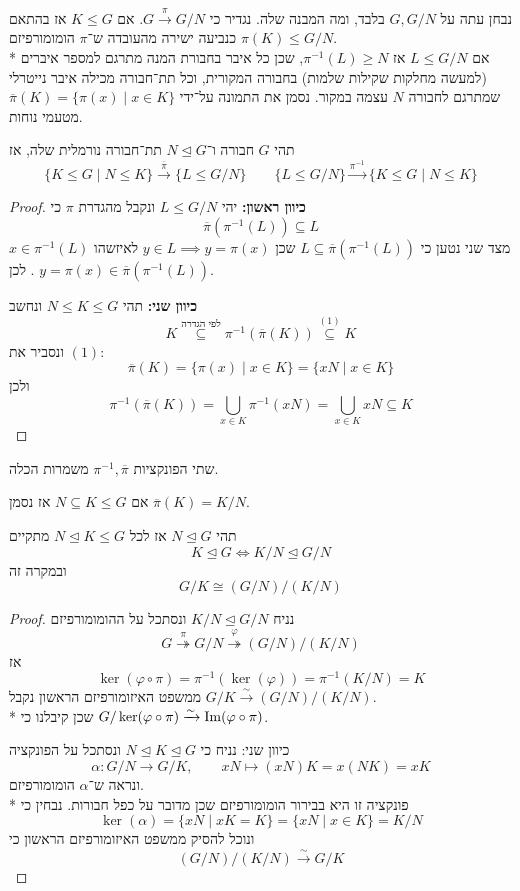 נבחן עתה על $G, G/N$ בלבד, ומה המבנה שלה. נגדיר כי $G \xrightarrow{\pi} G/N$. אם $K \le G$ אז בהתאם $\pi(K) \le G/N$ כנביעה ישירה מהעובדה ש־$\pi$ הומומורפיזם. \\*
אם $L \le G/N$ אז $\pi^{-1}(L) \ge N$, שכן כל איבר בחבורת המנה מתרגם למספר איברים (למעשה מחלקות שקילות שלמות) בחבורה המקורית, וכל תת־חבורה מכילה איבר נייטרלי שמתרגם לחבורה $N$ עצמה במקור.
נסמן את התמונה על־ידי $\overline{\pi}(K) = \{ \pi(x) \mid x \in K\}$ מטעמי נוחות.
\begin{theorem}
	תהי $G$ חבורה ו־$N \trianglelefteq G$ תת־חבורה נורמלית שלה, אז
	\[
		\{ K \le G \mid N \le K \} \xrightarrow{\overline{\pi}} \{ L \le G/N \}
		\qquad
		\{ L \le G/N \} \xrightarrow{\pi^{-1}} \{ K \le G \mid N \le K \} 
	\]
\end{theorem}
\begin{proof}
	\textbf{כיוון ראשון:}
	יהי $L \le G/N$ ונקבל מהגדרת $\pi$ כי
	\[
		\overline{\pi}(\pi^{-1}(L)) \subseteq L
	\]
	מצד שני נטען כי $L \subseteq \overline{\pi}(\pi^{-1}(L))$ שכן $y \in L \implies y = \pi(x)$ לאיזשהו $x \in \pi^{-1}(L)$.
	לכן $y = \pi(x) \in \overline{\pi}(\pi^{-1}(L))$.

	\textbf{כיוון שני:}
	תהי $N \le K \le G$ ונחשב
	\[
		K \overset{\text{לפי הגדרה}}{\subseteq} \pi^{-1}(\overline{\pi}(K)) \overset{(1)}{\subseteq} K
	\]
	ונסביר את $(1)$:
	\[
		\overline{\pi}(K) = \{ \pi(x) \mid x \in K \} = \{ xN \mid x \in K \}
	\]
	ולכן
	\[
		\pi^{-1}(\overline{\pi}(K)) = \bigcup_{x \in K} \pi^{-1}(x N) = \bigcup_{x \in K} x N \subseteq K
	\]
\end{proof}
\begin{remark}
	שתי הפונקציות $\pi^{-1}, \overline{\pi}$ משמרות הכלה.
\end{remark}
\begin{notation}
	אם $N \subseteq K \le G$ אז נסמן $\overline{\pi}(K) = K / N$.
\end{notation}
\begin{theorem}
	תהי $N \trianglelefteq G$ אז לכל $N \trianglelefteq K \le G$ מתקיים
	\[
		K \trianglelefteq G \iff K/N \trianglelefteq G/N
	\]
	ובמקרה זה
	\[
		G/K \cong (G/N)/(K/N)
	\]
\end{theorem}
\begin{proof}
	נניח $K/N \trianglelefteq G/N$ ונסתכל על ההומומורפיזם
	\[
		G \overset{\pi}{\twoheadrightarrow} G/N \overset{\varphi}{\twoheadrightarrow} (G/N)/(K/N)
	\]
	אז
	\[
		\ker(\varphi \circ \pi) = \pi^{-1}(\ker(\varphi)) = \pi^{-1}(K/N) = K
	\]
	ממשפט האיזומורפיזם הראשון נקבל $G/K \xrightarrow{\sim} (G/N)/(K/N)$. \\*
	שכן קיבלנו כי $G/\ker(\varphi \circ \pi) \xrightarrow{\sim} \operatorname{Im}(\varphi \circ \pi)$.

	כיוון שני:
	נניח כי $N \trianglelefteq K \trianglelefteq G$ ונסתכל על הפונקציה
	\[
		\alpha : G/N \to G/K,
		\qquad
		xN \mapsto (xN)K = x(NK) = xK
	\]
	ונראה ש־$\alpha$ הומומורפיזם. \\*
	פונקציה זו היא בבירור הומומורפיזם שכן מדובר על כפל חבורות.
	נבחין כי
	\[
		\ker(\alpha) = \{ xN \mid xK = K \}
		= \{ xN \mid x \in K \}
		= K/N
	\]
	ונוכל להסיק ממשפט האיזומורפיזם הראשון כי
	\[
		(G/N)/(K/N) \xrightarrow{\sim} G/K
	\]
\end{proof}

